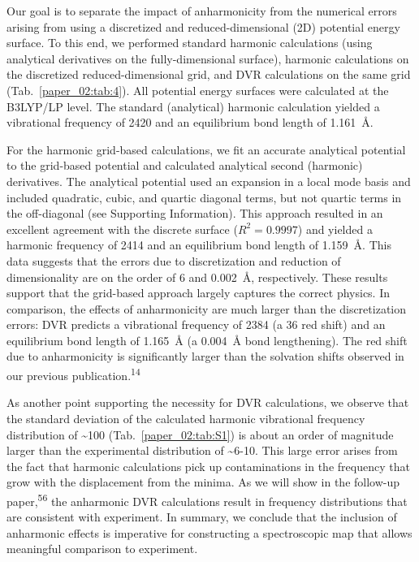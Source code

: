 Our goal is to separate the impact of anharmonicity from the numerical errors arising from using a discretized and reduced-dimensional (2D) potential energy surface. To this end, we performed standard harmonic calculations (using analytical derivatives on the fully-dimensional surface), harmonic calculations on the discretized reduced-dimensional grid, and DVR calculations on the same grid (Tab.~\ref{paper_02:tab:4}). All potential energy surfaces were calculated at the B3LYP/LP level. The standard (analytical) harmonic calculation yielded a vibrational frequency of \SI{2420}{\wavenumber} and an equilibrium bond length of \SI{1.161}{\angstrom}.

For the harmonic grid-based calculations, we fit an accurate analytical potential to the grid-based potential and calculated analytical second (harmonic) derivatives. The analytical potential used an expansion in a local mode basis and included quadratic, cubic, and quartic diagonal terms, but not quartic terms in the off-diagonal (see Supporting Information). This approach resulted in an excellent agreement with the discrete surface (\(R^2 = 0.9997\)) and yielded a harmonic frequency of \SI{2414}{\wavenumber} and an equilibrium  bond length of \SI{1.159}{\angstrom}. This data suggests that the errors due to discretization and reduction of dimensionality are on the order of \SI{6}{\wavenumber} and \SI{0.002}{\angstrom}, respectively. These results support that the grid-based approach largely captures the correct physics. In comparison, the effects of anharmonicity are much larger than the discretization errors: DVR predicts a vibrational frequency of \SI{2384}{\wavenumber} (a \SI{36}{\wavenumber} red shift) and an equilibrium bond length of \SI{1.165}{\angstrom} (a \SI{0.004}{\angstrom} bond lengthening). The red shift due to anharmonicity is significantly larger than the solvation shifts observed in our previous publication.\textsuperscript{14}

As another point supporting the necessity for DVR calculations, we observe that the standard deviation of the calculated harmonic vibrational frequency distribution of \textasciitilde{}\SI{100}{\wavenumber} (Tab.~\ref{paper_02:tab:S1}) is about an order of magnitude larger than the experimental distribution of \textasciitilde{}6-\SI{10}{\wavenumber}. This large error arises from the fact that harmonic calculations pick up contaminations in the frequency that grow with the displacement from the minima. As we will show in the follow-up paper,\textsuperscript{56} the anharmonic DVR calculations result in frequency distributions that are consistent with experiment. In summary, we conclude that the inclusion of anharmonic effects is imperative for constructing a spectroscopic map that allows meaningful comparison to experiment.

